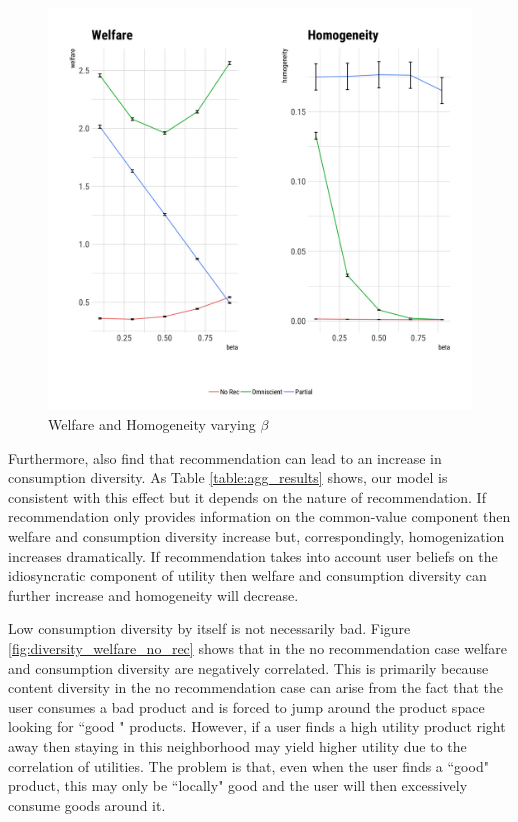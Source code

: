 \documentclass[sigconf]{acmart}
\begin{document}
\begin{figure}
\includegraphics[scale=0.05]{figures/welfare_homo_combo}
\caption{Welfare and Homogeneity varying $\beta$}
\label{fig:beta_vary}
\end{figure}
\par
Furthermore, \cite{nguyen2014exploring} also find that recommendation can lead to an increase in consumption diversity. As Table \ref{table:agg_results} shows, our model is consistent with this effect but it depends on the nature of recommendation. If recommendation only provides information on the common-value component then welfare and consumption diversity increase but, correspondingly, homogenization increases dramatically. If recommendation takes into account user beliefs on the idiosyncratic  component of utility then welfare and consumption diversity can further increase and homogeneity will decrease.
\par
Low consumption diversity by itself is not necessarily bad. Figure \ref{fig:diversity_welfare_no_rec} shows that in the no recommendation case welfare and consumption diversity are negatively correlated. This is primarily because content diversity in the no recommendation case can arise from the fact that the user consumes a bad product and is forced to jump around the product space looking for ``good " products. However, if a user finds a high utility product right away then staying in this neighborhood may yield higher utility due to the correlation of utilities. The problem is that, even when the user finds a ``good" product, this may only be ``locally" good and the user will then excessively consume goods around it.
\end{document}
